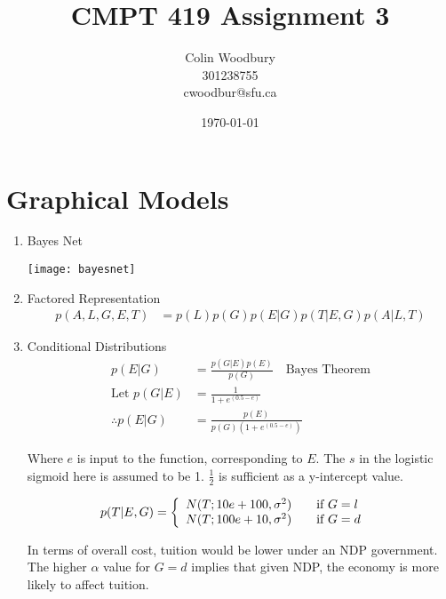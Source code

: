 \documentclass{article}
\begin{document}
\title{CMPT 419 Assignment 3}
\author{Colin Woodbury\\ 301238755\\ cwoodbur@sfu.ca}
\date{\today}
\maketitle

\tableofcontents
\clearpage

\section{Graphical Models}

\begin{enumerate}
\item Bayes Net
  \begin{center}
    \texttt{[image: bayesnet]}
  \end{center}

\item Factored Representation
  \begin{align*}
    p(A,L,G,E,T) &= p(L)p(G)p(E|G)p(T|E,G)p(A|L,T)
  \end{align*}

\item Conditional Distributions
  \begin{align*}
    p(E|G) &= \frac{p(G|E)p(E)}{p(G)} \quad \text{Bayes Theorem}\\
    \text{Let } p(G|E) &= \frac{1}{1 + e^{(0.5 - e)}}\\
    \therefore p(E|G) &= \frac{p(E)}{p(G)(1 + e^{(0.5 - e)})}
  \end{align*}

  Where $e$ is input to the function, corresponding to $E$. The $s$ in
  the logistic sigmoid here is assumed to be 1. $\frac{1}{2}$ is sufficient
  as a y-intercept value.
  
  \begin{align*}
    p(T|E,G) &= \left\{
    \begin{array}{l l}
      N(T; 10e + 100, \sigma^2) & \quad \text{if $G = l$}\\
      N(T; 100e + 10, \sigma^2) & \quad \text{if $G = d$}\\
    \end{array} \right.
  \end{align*}

  In terms of overall cost, tuition would be lower under an NDP government.
  The higher $\alpha$ value for $G = d$ implies that given NDP,
  the economy is more likely to affect tuition.
  

\end{enumerate}
\end{document}
